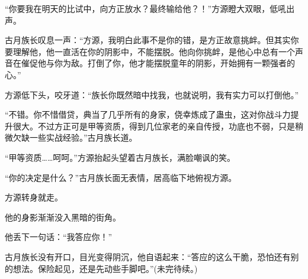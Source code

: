 \begin{this_body}
“你要我在明天的比试中，向方正放水？最终输给他？！”方源瞪大双眼，低吼出声。

古月族长叹息一声：“方源，我明白此事不是你的错，是方正故意挑衅。但其实你要理解他，他一直活在你的阴影中，不能摆脱。他向你挑衅，是他心中总有一个声音在催促他与你为敌。打倒了你，他才能摆脱童年的阴影，开始拥有一颗强者的心。”

方源低下头，咬牙道：“族长你既然暗中找我，也就说明，我有实力可以打倒他。”

“不错。你不惜借贷，典当了几乎所有的身家，侥幸炼成了蛊虫，这对你战斗力提升很大。不过方正可是甲等资质，得到几位家老的亲自传授，功底也不弱，只是稍微欠缺一些实战经验。”古月族长道。

“甲等资质……呵呵。”方源抬起头望着古月族长，满脸嘲讽的笑。

“你的决定是什么？”古月族长面无表情，居高临下地俯视方源。

方源转身就走。

他的身影渐渐没入黑暗的街角。

他丢下一句话：“我答应你！”

古月族长没有开口，目光变得阴沉，他自语起来：“答应的这么干脆，恐怕还有别的想法。保险起见，还是先动些手脚吧。”(未完待续。)

\end{this_body}

